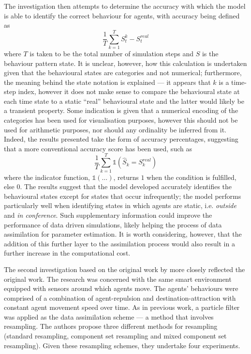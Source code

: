 The investigation then attempts to determine the accuracy with which the model
is able to identify the correct behaviour for agents, with accuracy being
defined as
\begin{equation}
    \frac{1}{T} \sum_{k=1}^T S_{t}^{k} - S_{t}^{real}
\end{equation}
where $T$ is taken to be the total number of simulation steps and $S$ is the
behaviour pattern state.
It is unclear, however, how this calculation is undertaken given that the
behavioural states are categories and not numerical; furthermore, the meaning
behind the state notation is explained --- it appears that $k$ is a time-step
index, however it does not make sense to compare the behavioural state at each
time state to a static ``real'' behavioural state and the latter would likely be
a transient property.
Some indication is given that a numerical encoding of the categories has been
used for visualisation purposes, however this should not be used for arithmetic
purposes, nor should any ordinality be inferred from it.
Indeed, the results presented take the form of accuracy percentages, suggesting
that a more conventional accuracy score has been used, such as
\begin{equation}
    \frac{1}{T} \sum_{k=1}^{T} \mathds{1} \left(
                \hat{S}_k = S_{k}^{real} \right)
\end{equation}
where the indicator function, $\mathds{1} \left( \ldots \right)$, returns $1$
when the condition is fulfilled, else $0$.
The results suggest that the model developed accurately identifies the
behavioural states except for states that occur infrequently; the model performs
particularly well when identifying states in which agents are static, i.e.
\textit{outside} and \textit{in conference}.
Such supplementary information could improve the performance of data driven
simulations, likely helping the process of data assimilation for parameter
estimation.
It is worth considering, however, that the addition of this further layer to the
assimilation process would also result in a further increase in the
computational cost.

The second investigation \citep{wang2015data} based on the original work by
\citet{wang2013data} more closely reflected the original work.
The research was concerned with the same smart environment equipped with
sensors around which agents move.
The agents' behaviours were comprised of a combination of agent-repulsion and
destination-attraction with constant agent movement speed over time.
As in previous work, a particle filter was applied as the data assimilation
scheme --- a method that involves resampling.
The authors propose three different methods for resampling (standard resampling,
component set resampling and mixed component set resampling).
Given these resampling schemes, they undertake four experiments.

